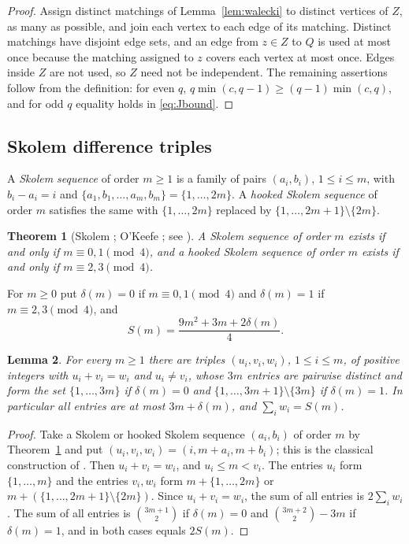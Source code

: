 \documentclass{amsart}
\newtheorem{theorem}{Theorem}[section]
\newtheorem{lemma}[theorem]{Lemma}
\theoremstyle{definition}
\theoremstyle{remark}
\numberwithin{equation}{section}
\numberwithin{table}{section}
\begin{document}
\begin{proof}
Assign distinct matchings of Lemma~\ref{lem:walecki} to distinct vertices of $Z$, as many as possible, and join each vertex to each edge of its matching. Distinct matchings have disjoint edge sets, and an edge from $z\in Z$ to $Q$ is used at most once because the matching assigned to $z$ covers each vertex at most once. Edges inside $Z$ are not used, so $Z$ need not be independent. The remaining assertions follow from the definition: for even $q$, $q\min(c,q-1)\ge(q-1)\min(c,q)$, and for odd $q$ equality holds in \eqref{eq:Jbound}.
\end{proof}

\subsection{Skolem difference triples}
A \emph{Skolem sequence} of order $m\ge1$ is a family of pairs $(a_i,b_i)$, $1\le i\le m$, with $b_i-a_i=i$ and $\{a_1,b_1,\dots,a_m,b_m\}=\{1,\dots,2m\}$. A \emph{hooked Skolem sequence} of order $m$ satisfies the same with $\{1,\dots,2m\}$ replaced by $\{1,\dots,2m+1\}\setminus\{2m\}$.

\begin{theorem}[Skolem \cite{Skolem}; O'Keefe \cite{OKeefe}; see {\cite[Theorem~5.3]{BBW}}]\label{thm:skolem}
A Skolem sequence of order $m$ exists if and only if $m\equiv0,1\pmod4$, and a hooked Skolem sequence of order $m$ exists if and only if $m\equiv2,3\pmod4$.
\end{theorem}

For $m\ge0$ put $\delta(m)=0$ if $m\equiv0,1\pmod4$ and $\delta(m)=1$ if $m\equiv2,3\pmod4$, and
\[
S(m)=\frac{9m^2+3m+2\delta(m)}{4}.
\]

\begin{lemma}\label{lem:triples}
For every $m\ge1$ there are triples $(u_i,v_i,w_i)$, $1\le i\le m$, of positive integers with $u_i+v_i=w_i$ and $u_i\ne v_i$, whose $3m$ entries are pairwise distinct and form the set $\{1,\dots,3m\}$ if $\delta(m)=0$ and $\{1,\dots,3m+1\}\setminus\{3m\}$ if $\delta(m)=1$. In particular all entries are at most $3m+\delta(m)$, and $\sum_i w_i=S(m)$.
\end{lemma}

\begin{proof}
Take a Skolem or hooked Skolem sequence $(a_i,b_i)$ of order $m$ by Theorem~\ref{thm:skolem} and put $(u_i,v_i,w_i)=(i,m+a_i,m+b_i)$; this is the classical construction of \cite[Section~1]{BGL}. Then $u_i+v_i=w_i$, and $u_i\le m<v_i$. The entries $u_i$ form $\{1,\dots,m\}$ and the entries $v_i,w_i$ form $m+\{1,\dots,2m\}$ or $m+(\{1,\dots,2m+1\}\setminus\{2m\})$. Since $u_i+v_i=w_i$, the sum of all entries is $2\sum_iw_i$. The sum of all entries is $\binom{3m+1}2$ if $\delta(m)=0$ and $\binom{3m+2}2-3m$ if $\delta(m)=1$, and in both cases equals $2S(m)$.
\end{proof}
\end{document}

